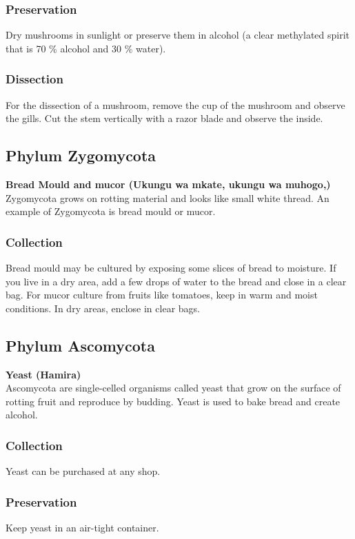 \subsubsection*{Preservation} 
Dry mushrooms in sunlight or preserve them in alcohol (a clear methylated spirit that is 70 \% alcohol and 30 \% water).

\subsubsection*{Dissection}
For the dissection of a mushroom, remove the cup of the mushroom and observe the gills. Cut the stem vertically with a razor blade and observe the inside.

\subsection{Phylum Zygomycota}

\textbf{Bread Mould and mucor (Ukungu wa mkate, ukungu wa muhogo,)}\\
Zygomycota grows on rotting material and looks like small white thread. An example of Zygomycota is bread mould or mucor.

\subsubsection{Collection}

Bread mould may be cultured by exposing some slices of bread to moisture. If you live in a dry area, add a few drops of water to the bread and close in a clear bag.
For mucor culture from fruits like tomatoes, keep in warm and moist conditions. In dry areas, enclose in clear bags. 

\subsection{Phylum Ascomycota}

\textbf{Yeast (Hamira)}\\
Ascomycota are single-celled organisms called yeast that grow on the surface of rotting fruit and reproduce by budding. Yeast is used to bake bread and create alcohol.

\subsubsection{Collection}
Yeast can be purchased at any shop.

\subsubsection*{Preservation} 
Keep yeast in an air-tight container.

